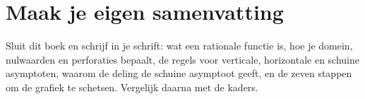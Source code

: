 

\begin{oefeningen}


\end{oefeningen}


\begin{oefeningen}





\end{oefeningen}


\ifzelfstudie
\section*{Maak je eigen samenvatting}
Sluit dit boek en schrijf in je schrift: wat een rationale functie is, hoe je domein, nulwaarden en perforaties bepaalt, de regels voor verticale, horizontale en schuine asymptoten, waarom de deling de schuine asymptoot geeft, en de zeven stappen om de grafiek te schetsen. Vergelijk daarna met de kaders.
\fi
